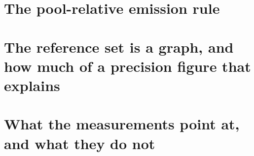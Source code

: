\documentclass{article}
\begin{document}
\section{The pool-relative emission rule}
\label{app:emission}


\section{The reference set is a graph, and how much of a precision figure that explains}
\label{app:closure}


\section{What the measurements point at, and what they do not}
\label{app:design}

\end{document}
